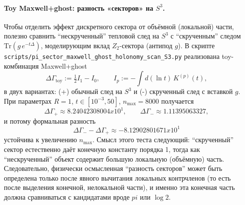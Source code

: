 \documentclass[12pt]{article}
\def\mathbb#1{#1}%
\def\pi{pi}%
\def\times{x}%
\begin{document}
\paragraph{Toy Maxwell+ghost: разность «секторов» на \texorpdfstring{$S^3$}{S3}.}
Чтобы отделить эффект дискретного сектора от объёмной (локальной) части, полезно сравнить ``нескрученный'' тепловой след на $S^3$ с ``скрученным'' следом $\mathrm{Tr}(g\,e^{-t\Delta})$, моделирующим вклад $\mathbb{Z}_2$-сектора (антипод $g$).
В скрипте \texttt{scripts/pi\_sector\_maxwell\_ghost\_holonomy\_scan\_S3.py} реализована toy-комбинация Maxwell+ghost
\begin{equation}
  \Delta\Gamma_{\mathrm{toy}}:=\tfrac12 I_1-I_0,
  \qquad
  I_p:=-\int d(\ln t)\,K^{(p)}(t),
\end{equation}
в двух вариантах:
(+) обычный след на $S^3$ и (-) скрученный след с вставкой $g$.
При параметрах $R=1$, $t\in[10^{-3},50]$, $n_{\max}=8000$ получается
\begin{equation}
  \Delta\Gamma_{+}\approx 8.24042308004\times 10^{1},
  \qquad
  \Delta\Gamma_{-}\approx 1.11395063327,
\end{equation}
и потому формальная разность
\begin{equation}
  \Delta\Gamma_{-}-\Delta\Gamma_{+}\approx -8.12902801671\times 10^{1}
\end{equation}
устойчива к увеличению $n_{\max}$.
Смысл этого теста следующий: ``скрученный'' сектор естественно даёт конечную константу порядка 1, тогда как ``нескрученный'' объект содержит большую локальную (объёмную) часть.
Следовательно, физически осмысленная ``разность секторов'' может быть определена только после явного вычитания локальных контрчленов (то есть после выделения конечной, нелокальной части), и именно эта конечная часть должна сравниваться с кандидатами вроде $\pi$ или $\log 2$.
\end{document}
